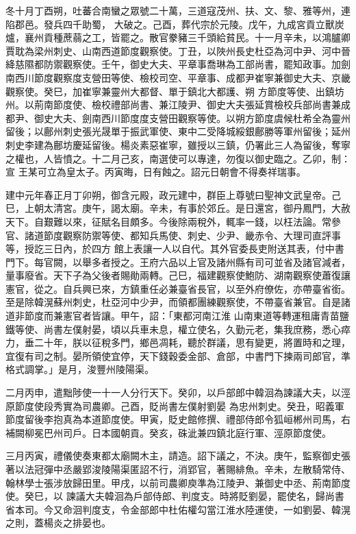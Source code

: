 \begin{pinyinscope}
 冬十月丁酉朔，吐蕃合南蠻之眾號二十萬，三道寇茂州、扶、文、黎、雅等州，連陷郡邑。發兵四千助蜀，
 大破之。己酉，葬代宗於元陵。戊午，九成宮貢立獸炭爐，襄州貢種蔗蒻之工，皆罷之。散官豢豬三千頭給貧民。十一月辛未，以鴻臚卿賈耽為梁州刺史、山南西道節度觀察使。丁丑，以陜州長史杜亞為河中尹、河中晉絳慈隰都防禦觀察使。壬午，御史大夫、平章事喬琳為工部尚書，罷知政事。加劍南西川節度觀察度支營田等使、檢校司空、平章事、成都尹崔寧兼御史大夫、京畿觀察使。癸巳，加崔寧兼靈州大都督、單于鎮北大都護、朔
 方節度等使、出鎮坊州。以荊南節度使、檢校禮部尚書、兼江陵尹、御史大夫張延賞檢校兵部尚書兼成都尹、御史大夫、劍南西川節度度支營田觀察等使。以朔方節度虞候杜希全為靈州留後；以鄜州刺史張光晟單于振武軍使、東中二受降城綏銀鄜勝等軍州留後；延州刺史李建為鄜坊慶延留後。楊炎素惡崔寧，雖授以三鎮，仍署此三人為留後，奪寧之權也，人皆憤之。十二月己亥，南選使可以專達，勿復以御史臨之。乙卯，制：宣
 王某可立為皇太子。丙寅晦，日有蝕之。詔元日朝會不得奏祥瑞事。



 建中元年春正月丁卯朔，御含元殿，政元建中，群臣上尊號曰聖神文武皇帝。己巳，上朝太清宮。庚午，謁太廟。辛未，有事於郊丘。是日還宮，御丹鳳門，大赦天下。自艱難以來，征賦名目頗多。今後除兩稅外，輒率一錢，以枉法論。常參官、諸道節度觀察防禦等使、都知兵馬使、刺史、少尹、畿赤令、大理司直評事等，授訖三日內，於四方
 館上表讓一人以自代。其外官委長吏附送其表，付中書門下。每官闕，以舉多者授之。王府六品以上官及諸州縣有司可並省及諸官減者，量事廢省。天下子為父後者賜勛兩轉。己巳，福建觀察使鮑防、湖南觀察使蕭復讓憲官，從之。自兵興已來，方鎮重任必兼臺省長官，以至外府僚佐，亦帶臺省銜。至是除韓滉蘇州刺史，杜亞河中少尹，而領都團練觀察使，不帶臺省兼官。自是諸道非節度而兼憲官者皆讓。甲午，詔：「東都河南江淮
 山南東道等轉運租庸青苗鹽鐵等使、尚書左僕射晏，頃以兵車未息，權立使名，久勤元老，集我庶務，悉心瘁力，垂二十年，朕以征稅多門，鄉邑凋耗，聽於群議，思有變更，將置時和之理，宜復有司之制。晏所領使宜停，天下錢穀委金部、倉部，中書門下揀兩司郎官，準格式調掌。」是月，浚豐州陵陽渠。



 二月丙申，遣黜陟使一十一人分行天下。癸卯，以戶部郎中韓洄為諫議大夫，以涇原節度使段秀實為司農卿。己酉，貶尚書左僕射劉晏
 為忠州刺史。癸丑，昭義軍節度留後李抱真為本道節度使。甲寅，貶史館修撰、禮部侍郎令狐峘郴州司馬，右補闕柳冕巴州司戶。日本國朝貢。癸亥，硃泚兼四鎮北庭行軍、涇原節度使。



 三月丙寅，禮儀使奏東都太廟闕木主，請造。詔下議之，不決。庚午，監察御史張著以法冠彈中丞嚴郢浚陵陽渠匿詔不行，消郢官，著賜緋魚。辛未，左散騎常侍、翰林學士張涉放歸田里。甲戌，以前司農卿庾準為江陵尹、兼御史中丞、荊南節度使。癸巳，以
 諫議大夫韓洄為戶部侍郎、判度支。時將貶劉晏，罷使名，歸尚書省本司。今又命洄判度支，令金部郎中杜佑權勾當江淮水陸運使，一如劉晏、韓滉之則，蓋楊炎之排晏也。




\end{pinyinscope}
